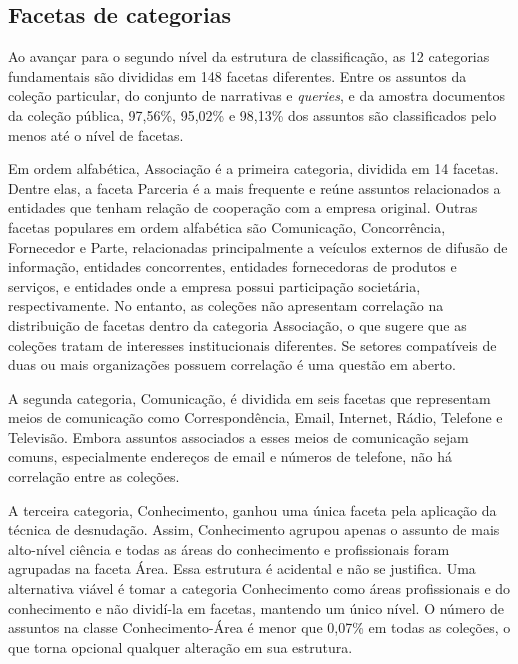 \subsection{Facetas de categorias}
\label{avaliacao-facetas}

Ao avançar para o segundo nível da estrutura de classificação, as 12 categorias fundamentais são divididas em 148 facetas diferentes. Entre os assuntos da coleção particular, do conjunto de narrativas e \textit{queries}, e da amostra documentos da coleção pública, 97,56\%, 95,02\% e 98,13\% dos assuntos são classificados pelo menos até o nível de facetas.

Em ordem alfabética, Associação é a primeira categoria, dividida em 14 facetas. Dentre elas, a faceta Parceria é a mais frequente e reúne assuntos relacionados a entidades que tenham relação de cooperação com a empresa original. Outras facetas populares em ordem alfabética são Comunicação, Concorrência, Fornecedor e Parte, relacionadas principalmente a veículos externos de difusão de informação, entidades concorrentes, entidades fornecedoras de produtos e serviços, e entidades onde a empresa possui participação societária, respectivamente. No entanto, as coleções não apresentam correlação na distribuição de facetas dentro da categoria Associação, o que sugere que as coleções tratam de interesses institucionais diferentes. Se setores compatíveis de duas ou mais organizações possuem correlação é uma questão em aberto.

A segunda categoria, Comunicação, é dividida em seis facetas que representam meios de comunicação como Correspondência, Email, Internet, Rádio, Telefone e Televisão. Embora assuntos associados a esses meios de comunicação sejam comuns, especialmente endereços de email e números de telefone, não há correlação entre as coleções.

A terceira categoria, Conhecimento, ganhou uma única faceta pela aplicação da técnica de desnudação. Assim, Conhecimento agrupou apenas o assunto de mais alto-nível ciência e todas as áreas do conhecimento e profissionais foram agrupadas na faceta Área. Essa estrutura é acidental e não se justifica. Uma alternativa viável é tomar a categoria Conhecimento como áreas profissionais e do conhecimento e não dividí-la em facetas, mantendo um único nível. O número de assuntos na classe Conhecimento-Área é menor que 0,07\% em todas as coleções, o que torna opcional qualquer alteração em sua estrutura.

